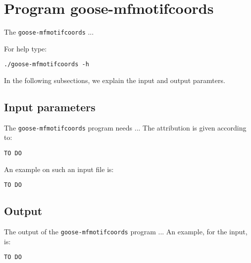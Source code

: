 \section{Program goose-mfmotifcoords}
The \texttt{goose-mfmotifcoords} ...

For help type:
\begin{lstlisting}
./goose-mfmotifcoords -h
\end{lstlisting}
In the following subsections, we explain the input and output paramters.

\subsection*{Input parameters}

The \texttt{goose-mfmotifcoords} program needs ...
The attribution is given according to:
\begin{lstlisting}
TO DO
\end{lstlisting}

An example on such an input file is:
\begin{lstlisting}
TO DO
\end{lstlisting}

\subsection*{Output}
The output of the \texttt{goose-mfmotifcoords} program ...
An example, for the input, is:
\begin{lstlisting}
TO DO
\end{lstlisting}
